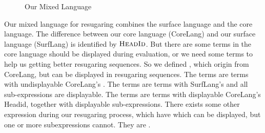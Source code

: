 \begin{figure}[t]
\begin{centering}
	\framebox[36em][c]{
		\parbox[t]{33em}{
			\[
			\begin{array}{lcl}
			\m{Exp} &::=& \m{DisplayableExp}\\
			&|& \m{UndisplayableExp}\\
\\
			\m{DisplayableExp} &::=& \m{SurfExp}\\
			&|& \m{CommonExp}
\\
			\m{UndisplayableExp} &::=& \m{CoreExp}\\
			&|& \m{OtherSurfExp}\\
			&|& \m{OtherCommonExp}\\
\\
			\m{CoreExp} &::=& (\m{CoreHead}~\m{Exp}*)\\
\\
			\m{SurfExp} &::=& (\m{SurfHead}~\m{DisplayableExp}*)\\
\\
			\m{CommonExp} &::=& (\m{CommonHead}~\m{DisplayableExp}*)\\
			&|& c \qquad \note{// constant value}\\
			&|& x \qquad \note{// variable} \\
\\
			\m{OtherSurfExp} &::=& (\m{SurfHead}~\m{Exp}*~\m{UndisplayableExp}~\m{Exp}*)\\
\\
			\m{OtherCommonExp} &::=& (\m{CommonHead}~\m{Exp}*~\m{UndisplayableExp}~\m{Exp}*)
			\end{array}
			\]
		}
	}
\end{centering}
\caption{Our Mixed Language}
\label{fig:mix}
\end{figure}

Our mixed language for resugaring combines the surface language and the core language.
%
The difference between our core language (CoreLang) and our surface language (SurfLang) is identified by $\mbox{\sc HeadId}$. But there are some terms in the core language should be displayed during evaluation, or we need some terms to help us getting better resugaring sequences. So we defined , which origin from CoreLang, but can be displayed in resugaring sequences. The  terms are terms with undisplayable CoreLang's . The  terms are terms with SurfLang's  and all sub-expressions are displayable. The  terms are terms with displayable CoreLang's Headid, together with displayable sub-expressions. There exists some other expression during our resugaring process, which have  which can be displayed, but one or more subexpressions cannot. They are .

